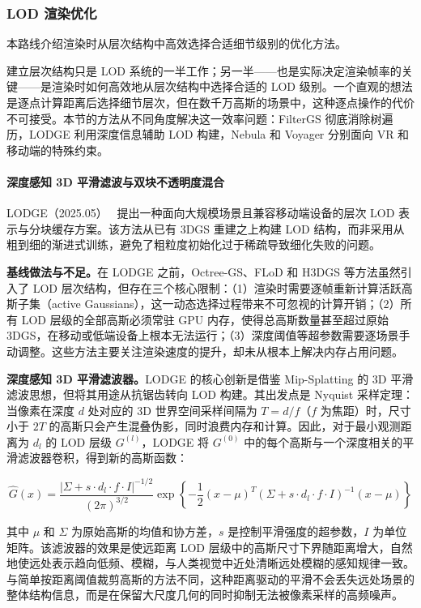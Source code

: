 \subsubsection{LOD 渲染优化}

本路线介绍渲染时从层次结构中高效选择合适细节级别的优化方法。

建立层次结构只是 LOD 系统的一半工作；另一半——也是实际决定渲染帧率的关键——是渲染时如何高效地从层次结构中选择合适的 LOD 级别。一个直观的想法是逐点计算距离后选择细节层次，但在数千万高斯的场景中，这种逐点操作的代价不可接受。本节的方法从不同角度解决这一效率问题：FilterGS 彻底消除树遍历，LODGE 利用深度信息辅助 LOD 构建，Nebula 和 Voyager 分别面向 VR 和移动端的特殊约束。

\paragraph{深度感知 3D 平滑滤波与双块不透明度混合}

LODGE（2025.05）~\cite{2505_23158} 提出一种面向大规模场景且兼容移动端设备的层次 LOD 表示与分块缓存方案。该方法从已有 3DGS 重建之上构建 LOD 结构，而非采用从粗到细的渐进式训练，避免了粗粒度初始化过于稀疏导致细化失败的问题。

\textbf{基线做法与不足。}在 LODGE 之前，Octree-GS、FLoD 和 H3DGS 等方法虽然引入了 LOD 层次结构，但存在三个核心限制：（1）渲染时需要逐帧重新计算活跃高斯子集（active Gaussians），这一动态选择过程带来不可忽视的计算开销；（2）所有 LOD 层级的全部高斯必须常驻 GPU 内存，使得总高斯数量甚至超过原始 3DGS，在移动或低端设备上根本无法运行；（3）深度阈值等超参数需要逐场景手动调整。这些方法主要关注渲染速度的提升，却未从根本上解决内存占用问题。

\textbf{深度感知 3D 平滑滤波器。}LODGE 的核心创新是借鉴 Mip-Splatting 的 3D 平滑滤波思想，但将其用途从抗锯齿转向 LOD 构建。其出发点是 Nyquist 采样定理：当像素在深度 $d$ 处对应的 3D 世界空间采样间隔为 $T = d/f$（$f$ 为焦距）时，尺寸小于 $2T$ 的高斯只会产生混叠伪影，同时浪费内存和计算。因此，对于最小观测距离为 $d_l$ 的 LOD 层级 $G^{(l)}$，LODGE 将 $G^{(0)}$ 中的每个高斯与一个深度相关的平滑滤波器卷积，得到新的高斯函数：

\begin{equation}
\hat{G}(x) = \frac{|\Sigma + s \cdot d_l \cdot f \cdot I|^{-1/2}}{(2\pi)^{3/2}} \exp\left\{-\frac{1}{2}(x-\mu)^T (\Sigma + s \cdot d_l \cdot f \cdot I)^{-1}(x-\mu)\right\}
\end{equation}

其中 $\mu$ 和 $\Sigma$ 为原始高斯的均值和协方差，$s$ 是控制平滑强度的超参数，$I$ 为单位矩阵。该滤波器的效果是使远距离 LOD 层级中的高斯尺寸下界随距离增大，自然地使远处表示趋向低频、模糊，与人类视觉中近处清晰远处模糊的感知规律一致。与简单按距离阈值裁剪高斯的方法不同，这种距离驱动的平滑不会丢失远处场景的整体结构信息，而是在保留大尺度几何的同时抑制无法被像素采样的高频噪声。

